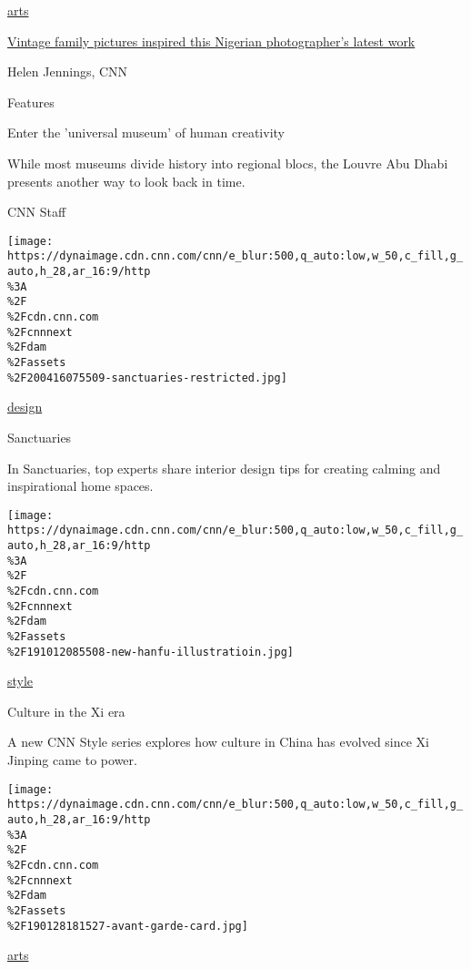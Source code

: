 \href{/style/arts}{arts}

\href{/style/article/a-ti-de-oye-diran-photography/index.html}{Vintage
family pictures inspired this Nigerian photographer's latest work}

Helen Jennings, CNN

\href{https://edition.cnn.com/interactive/2019/11/style/louvre-abu-dhabi-collection/}{}

Features

Enter the 'universal museum' of human creativity

While most museums divide history into regional blocs, the Louvre Abu
Dhabi presents another way to look back in time.

CNN Staff

\href{/style/specials/sanctuaries}{}

\texttt{[image: https://dynaimage.cdn.cnn.com/cnn/e\_blur:500,q\_auto:low,w\_50,c\_fill,g\_auto,h\_28,ar\_16:9/http\\\%3A\\\%2F\\\%2Fcdn.cnn.com\\\%2Fcnnnext\\\%2Fdam\\\%2Fassets\\\%2F200416075509-sanctuaries-restricted.jpg]}

\href{/style/design}{design}

\href{/style/specials/sanctuaries}{}

Sanctuaries

In Sanctuaries, top experts share interior design tips for creating
calming and inspirational home spaces.

\href{/style/specials/culture-in-the-xi-era}{}

\texttt{[image: https://dynaimage.cdn.cnn.com/cnn/e\_blur:500,q\_auto:low,w\_50,c\_fill,g\_auto,h\_28,ar\_16:9/http\\\%3A\\\%2F\\\%2Fcdn.cnn.com\\\%2Fcnnnext\\\%2Fdam\\\%2Fassets\\\%2F191012085508-new-hanfu-illustratioin.jpg]}

\href{/style}{style}

\href{/style/specials/culture-in-the-xi-era}{}

Culture in the Xi era

A new CNN Style series explores how culture in China has evolved since
Xi Jinping came to power.

\href{/style/specials/africa-avant-garde}{}

\texttt{[image: https://dynaimage.cdn.cnn.com/cnn/e\_blur:500,q\_auto:low,w\_50,c\_fill,g\_auto,h\_28,ar\_16:9/http\\\%3A\\\%2F\\\%2Fcdn.cnn.com\\\%2Fcnnnext\\\%2Fdam\\\%2Fassets\\\%2F190128181527-avant-garde-card.jpg]}

\href{/style/arts}{arts}

\href{/style/specials/africa-avant-garde}{}

